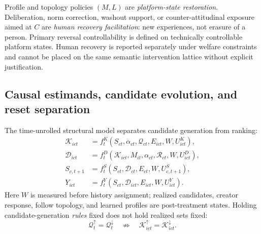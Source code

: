 \documentclass[pdflatex,sn-mathphys-num]{sn-jnl}
\begin{document}
Profile and topology policies $(M,L)$ are \emph{platform-state restoration}. Deliberation, norm correction, washout support, or counter-attitudinal exposure aimed at $C$ are \emph{human recovery facilitation}: new experiences, not erasure of a person. Primary reversal controllability is defined on technically controllable platform states. Human recovery is reported separately under welfare constraints and cannot be placed on the same semantic intervention lattice without explicit justification.

\subsection{Causal estimands, candidate evolution, and reset separation}

The time-unrolled structural model separates candidate generation from ranking:
\begin{align}
\mathcal K_{ict}&=f_t^K(S_{ct},\alpha_{ct},\mathcal Q_{ct},E_{ict},W,U^K_{ict}),
\label{eq:scm-candidates}\\
\mathcal D_{ict}&=f_t^D(\mathcal K_{ict},M_{it},\alpha_{ct},\mathcal R_{ct},W,U^D_{ict}),\\
S_{c,t+1}&=f_t^S(S_{ct},\mathcal D_{ct},E_{ct},W,U^S_{c,t+1}),\\
Y_{ict}&=f_t^Y(S_{ct},\mathcal D_{ict},E_{ict},W,U^Y_{ict}).
\label{eq:scm}
\end{align}
Here $W$ is measured before history assignment; realized candidates, creator response, follow topology, and learned profiles are post-treatment states. Holding candidate-generation \emph{rules} fixed does not hold realized sets fixed:
\begin{equation}
\mathcal Q_t^\uparrow=\mathcal Q_t^\downarrow
\quad\not\Rightarrow\quad
\mathcal K_{ict}^\uparrow=\mathcal K_{ict}^\downarrow.
\end{equation}
\end{document}
